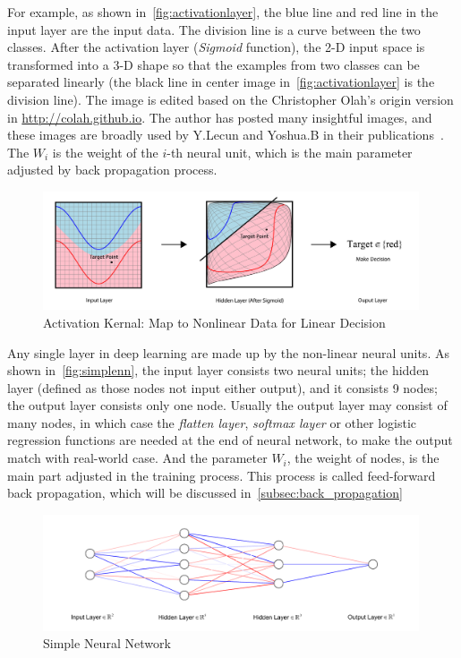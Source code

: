 \begin{spacing}{1.5}
For example, as shown in~\autoref{fig:activationlayer}, the blue line and red line in the input layer are the input data. The division line is a curve between the two classes. After the activation layer (\textit{Sigmoid} function), the 2-D input space is transformed into a 3-D shape so that the examples from two classes can be separated linearly (the black line in center image in~\autoref{fig:activationlayer} is the division line). The image is edited based on the Christopher Olah's origin version in  \href{http://colah.github.io/posts/2014-03-NN-Manifolds-Topology/}{http://colah.github.io}. The author has posted many insightful images, and these images are broadly used by Y.Lecun and Yoshua.B in their publications~\cite{bengio2017deep, lecun2015deep}. The $W_i$ is the weight of the $i$-th neural unit, which is the main parameter adjusted by back propagation process.


\begin{figure}[th]
\centering
\includegraphics[width=0.99\textwidth, fbox]{Chapter2/activation.pdf}
\caption{Activation Kernal: Map to Nonlinear Data for Linear Decision~\cite{olah2014neural}}
\label{fig:activationlayer} 
\end{figure}

Any single layer in deep learning are made up by the non-linear neural units. As shown in~\autoref{fig:simplenn}, the input layer consists two neural units; the hidden layer (defined as those nodes not input either output), and it consists 9 nodes; the output layer consists only one node. Usually the output layer may consist of many nodes, in which case the \textit{flatten layer}, \textit{softmax layer} or other logistic regression functions are needed at the end of neural network, to make the output match with real-world case. And the parameter $W_i$, the weight of nodes, is the main part adjusted in the training process. This process is called feed-forward back propagation, which will be discussed in~\autoref{subsec:back_propagation}

\begin{figure}[th]
\centering
\includegraphics[width=0.99\textwidth, fbox]{Chapter2/simplenn.pdf}
\caption{Simple Neural Network}
\label{fig:simplenn} 
\end{figure}


\end{spacing}
